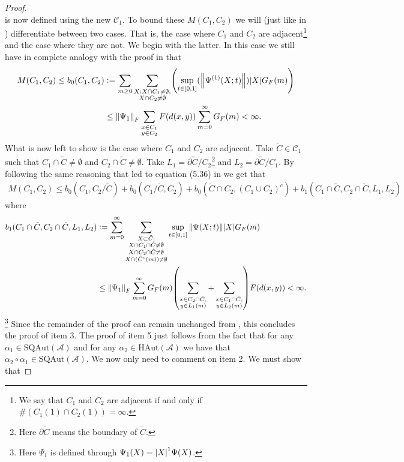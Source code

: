 \documentclass[12pt,a4paper,twoside]{article}
\newcommand{\defeq}{\vcentcolon=}
\let\originalleft\left
\let\originalright\right
\renewcommand{\left}{\mathopen{}\mathclose\bgroup\originalleft}
\renewcommand{\right}{\aftergroup\egroup\originalright}
\renewcommand{\AA}{\mathcal A}
\theoremstyle{definition}
\numberwithin{equation}{section}
\begin{document}
\begin{proof}
\begin{equation}
	\end{equation}
	is now defined using the new $\mathcal{C}_1$. To bound these $M(C_1,C_2)$ we will (just like in \cite{ogata2021h3gmathbb}) differentiate between two cases. That is, the case where $C_1$ and $C_2$ are adjacent\footnote{We say that $C_1$ and $C_2$ are adjacent if and only if $\#(C_1(1)\cap C_2(1))=\infty$.} and the case where they are not. We begin with the latter. In this case we still have in complete analogy with the proof in \cite{ogata2021h3gmathbb} that
	\begin{align}
		M(C_1,C_2)\leq b_0(C_1,C_2) &\defeq \sum_{m\geq 0}\sum_{\substack{X:X\cap C_1\neq\emptyset,\\X\cap C_2\neq\emptyset}}\left(\sup_{t\in[0,1]}(\norm{\Psi^{(1)}(X;t)})\abs{X}G_F(m)\right)\\
		&\leq \norm{\Psi_1}_F\sum_{\substack{x\in C_1\\y\in C_2}}F(d(x,y))\sum_{m=0}^\infty G_F(m)<\infty.
	\end{align}
	What is now left to show is the case where $C_1$ and $C_2$ are adjacent. Take $\tilde{C}\in\mathcal{C}_1$ such that $C_1\cap\tilde{C}\neq\emptyset$ and $C_2\cap\tilde{C}\neq\emptyset$. Take $L_1=\partial\tilde{C}/C_2$\footnote{Here $\partial \tilde{C}$ means the boundary of $\tilde C$.} and $L_2=\partial\tilde{C}/C_1$. By following the same reasoning that led to equation (5.36) in \cite{ogata2021h3gmathbb} we get that
	\begin{align}
		M(C_1,C_2)\leq b_0(C_1,C_2/\tilde{C})+b_0(C_1/\tilde{C},C_2)+b_0(\tilde{C}\cap C_2,(C_1\cup C_2)^c)+b_1(C_1\cap\tilde{C},C_2\cap\tilde{C},L_1,L_2)
	\end{align}
	where
	\begin{align}
		b_1(C_1\cap\tilde{C},C_2\cap\tilde{C},L_1,L_2)&\defeq\sum_{m=0}^\infty \sum_{\substack{X\subset \tilde{C}:\\ X\cap C_1\cap\tilde{C}\neq\emptyset\\X\cap C_2\cap\tilde{C}\neq\emptyset\\ X\cap (\tilde{C}^c(m))\neq\emptyset}}\sup_{t\in[0,1]}\norm{\Psi(X;t)}\abs{X}G_F(m)\\
		&\leq \norm{\Psi_1}_F\sum_{m=0}^{\infty}G_F(m)\left(\sum_{\substack{x\in C_2\cap\tilde{C},\\y\in L_1(m)}}+\sum_{\substack{x\in C_1\cap\tilde{C},\\y\in L_2(m)}}\right)F(d(x,y))<\infty.
	\end{align}
	\footnote{Here $\Psi_1$ is defined through $\Psi_1(X)=\abs{X}^1 \Psi(X)$.} Since the remainder of the proof can remain unchanged from \cite{ogata2021h3gmathbb}, this concludes the proof of item 3. The proof of item 5 just follows from the fact that for any $\alpha_1\in\textrm{SQAut}(\AA)$ and for any $\alpha_2\in\textrm{HAut}(\AA)$ we have that $\alpha_2\circ\alpha_1\in\textrm{SQAut}(\AA)$. We now only need to comment on item 2. We must show that

\end{proof}
\end{document}
